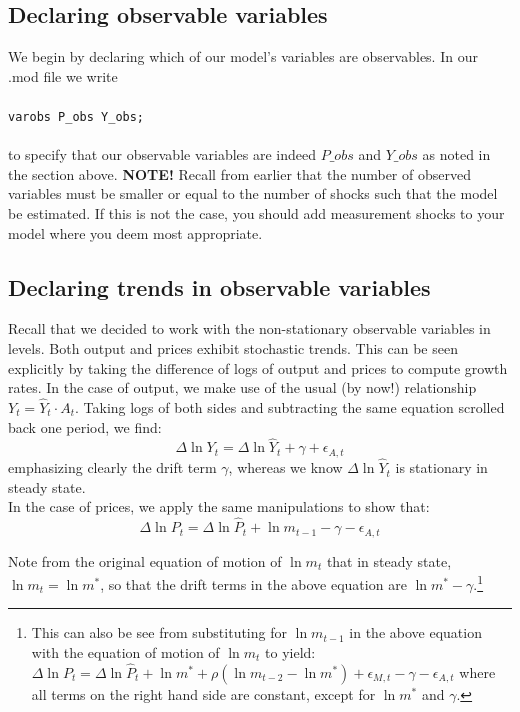 \subsection{Declaring observable variables}
We begin by declaring which of our model's variables are observables. In our .mod file we write\\
\\
\texttt{varobs P\_obs Y\_obs;}\\
\\
to specify that our observable variables are indeed $P\_obs$ and $Y\_obs$ as noted in the section above. \textsf{\textbf{NOTE!}} Recall from earlier that the number of observed variables must be smaller or equal to the number of shocks such that the model be estimated. If this is not the case, you should add measurement shocks to your model where you deem most appropriate. \\

\subsection{Declaring trends in observable variables}

Recall that we decided to work with the non-stationary observable variables in levels. Both output and prices exhibit stochastic trends. This can be seen explicitly by taking the difference of logs of output and prices to compute growth rates. In the case of output, we make use of the usual (by now!) relationship $Y_t=\widehat Y_t \cdot A_t$. Taking logs of both sides and subtracting the same equation scrolled back one period, we find:
\[
\Delta \ln Y_t = \Delta \ln \widehat Y_t + \gamma + \epsilon_{A,t}
\]
emphasizing clearly the drift term $\gamma$, whereas we know $\Delta \ln \widehat Y_t$ is stationary in steady state. \\

In the case of prices, we apply the same manipulations to show that:
\[
\Delta \ln P_t = \Delta \ln \widehat P_t + \ln m_{t-1} - \gamma - \epsilon_{A,t}
\]

Note from the original equation of motion of $\ln m_t$ that in steady state, $\ln m_t=\ln m^*$, so that the drift terms in the above equation are $\ln m^* - \gamma$.\footnote{This can also be see from substituting for $\ln m_{t-1}$ in the above equation with the equation of motion of $\ln m_t$ to yield: $\Delta \ln P_t = \Delta \ln \widehat P_t + \ln m^* + \rho(\ln m_{t-2}-\ln m^*) + \epsilon_{M,t} - \gamma - \epsilon_{A,t}$ where all terms on the right hand side are constant, except for $\ln m^*$ and $\gamma$.} \\

